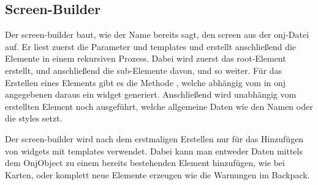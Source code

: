
\renewcommand{\kapitelautor}{Autor: Felix Zwickelstorfer}
\subsection{Screen-Builder}\label{sec:screen-builder}
\renewcommand{\kapitelautor}{Autor: Felix Zwickelstorfer}
Der screen-builder baut, wie der Name bereits sagt, den screen aus der onj-Datei auf.
Er liest zuerst die Parameter und templates und erstellt anschließend die Elemente in einem rekursiven Prozess.
Dabei wird zuerst das root-Element erstellt, und anschließend die sub-Elemente davon, und so weiter.
Für das Erstellen eines Elements gibt es die Methode , welche abhängig vom in onj angegebenen  daraus ein widget generiert.
Anschließend wird unabhängig vom erstellten Element noch  ausgeführt, welche allgemeine Daten wie \zB den Namen oder die styles setzt.

Der screen-builder wird nach dem erstmaligen Erstellen nur für das Hinzufügen von widgets mit templates verwendet.
Dabei kann man entweder Daten mittels dem  OnjObject zu einem bereits bestehenden Element hinzufügen, wie \zB bei Karten, oder komplett neue Elemente erzeugen wie die Warnungen im Backpack.